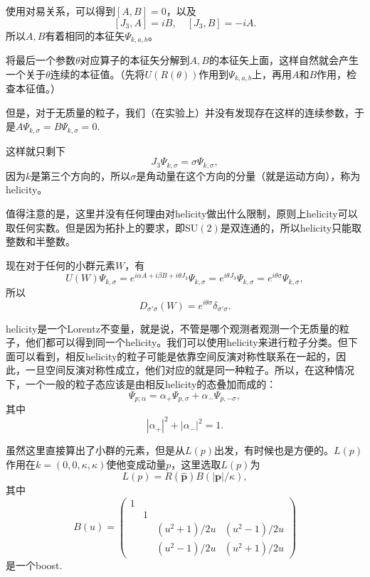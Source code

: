 \documentclass[9pt]{extbook}
\begin{document}
使用对易关系，可以得到$[A,B]=0$，以及
\[
[J_3,A]=iB,\quad [J_3,B]=-iA.
\]
所以$A,B$有着相同的本征矢$\Psi_{k,a,b}$。

将最后一个参数$\theta$对应算子的本征矢分解到$A,B$的本征矢上面，这样自然就会产生一个关于$\theta$连续的本征值。（先将$U(R(\theta))$作用到$\Psi_{k,a,b}$上，再用$A$和$B$作用，检查本征值。）

但是，对于无质量的粒子，我们（在实验上）并没有发现存在这样的连续参数，于是$A\Psi_{k,\sigma}=B\Psi_{k,\sigma}=0$.

这样就只剩下\[J_3\Psi_{k,\sigma}=\sigma\Psi_{k,\sigma},\]
因为$k$是第三个方向的，所以$\sigma$是角动量在这个方向的分量（就是运动方向），称为helicity。

值得注意的是，这里并没有任何理由对helicity做出什么限制，原则上helicity可以取任何实数。但是因为拓扑上的要求，即$\mathrm{SU}(2)$是双连通的，所以helicity只能取整数和半整数。

现在对于任何的小群元素$W$，有
\[
U(W)\Psi_{k,\sigma}=e^{i\alpha A+i\beta B+i\theta J_3}\Psi_{k,\sigma}=e^{i\theta J_3}\Psi_{k,\sigma}=e^{i\theta \sigma}\Psi_{k,\sigma},
\]
所以
\[
D_{\sigma'\sigma}(W)=e^{i\theta \sigma}\delta_{\sigma'\sigma}.
\]

helicity是一个Lorentz不变量，就是说，不管是哪个观测者观测一个无质量的粒子，他们都可以得到同一个helicity。我们可以使用helicity来进行粒子分类。但下面可以看到，相反helicity的粒子可能是依靠空间反演对称性联系在一起的，因此，一旦空间反演对称性成立，他们对应的就是同一种粒子。所以，在这种情况下，一个一般的粒子态应该是由相反helicity的态叠加而成的：
\[
\Psi_{p;\alpha}=\alpha_+\Psi_{p,\sigma}+\alpha_-\Psi_{p,-\sigma},
\]
其中
\[
|\alpha_+|^2+|\alpha_-|^2=1.
\]

虽然这里直接算出了小群的元素，但是从$L(p)$出发，有时候也是方便的。$L(p)$作用在$k=(0,0,\kappa,\kappa)$使他变成动量$p$，这里选取$L(p)$为
\[
	L(p)=R(\hat{\bm{p}})B(|\bm{p}|/\kappa),
\]
其中
\[
B(u)=\begin{pmatrix}
1&&&\\
&1&&\\
&&(u^2+1)/2u&(u^2-1)/2u\\
&&(u^2-1)/2u&(u^2+1)/2u
\end{pmatrix}
\]
是一个boost.
\end{document}
